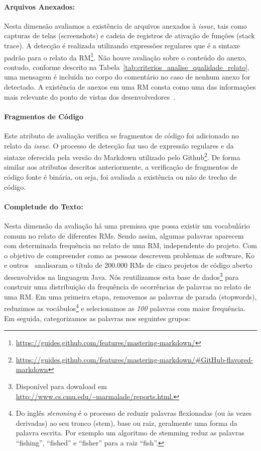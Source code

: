\paragraph{Arquivos Anexados:}
\label{par:arquivos_anexados}

Nesta dimensão avaliamos a existência de arquivos anexados à \textit{issue},
tais como capturas de telas (screenshots) e cadeia de registros de ativação de
funções (stack trace). A detecção é realizada utilizando expressões regulares
que é a sintaxe padrão para o relato da
RM\footnote{\url{https://guides.github.com/features/mastering-markdown/}}. Não
houve avaliação sobre o conteúdo do anexo, contudo, conforme descrito na
Tabela~\ref{tab:criterios_analise_qualidade_relato}, uma mensagem é incluída no
corpo do comentário no caso de nenhum anexo for detectado. A existência de
anexos em uma RM consta como uma das informações mais relevante do ponto de
vistas dos desenvolvedores~\cite{bettenburg2008makes}.

\paragraph{Fragmentos de Código}
\label{par:fragmentos_de_código}

Este atributo de avaliação verifica se fragmentos de código foi adicionado no
relato da \textit{issue}. O processo de detecção faz uso de expressão regulares
e da sintaxe oferecida pela versão do Markdown utilizado pelo
Github\footnote{\url{https://guides.github.com/features/mastering-markdown/\#GitHub-flavored-markdown}}.
De forma similar aos atributos descritos anteriormente, a verificação de
fragmentos de código fonte é binária, ou seja, foi avaliada a existência ou não
de trecho de código.

\paragraph{Completude do Texto:}
\label{par:completude_de_palavras_chaves}

Nesta dimensão da avaliação há uma premissa que possa existir um vocabulário
comum no relato de diferentes RMs. Sendo assim, algumas palavras aparecem com
determinada frequência no relato de uma RM, independente do projeto. Com o
objetivo de compreender como as pessoas descrevem problemas de software, Ko e
outros~\cite{ko2006linguistic} analisaram o título de 200.000 RMs de cinco
projetos de código aberto desenvolvidos na linguagem Java. Nós reutilizamos esta
base de dados\footnote{Disponível para download em
    \url{http://www.cs.cmu.edu/~marmalade/reports.html.}} para construir uma
distribuição da frequência de ocorrências de palavras no relato de uma RM\@.  Em
uma primeira etapa, removemos as palavras de parada (stopwords), reduzimos as
vocábulos\footnote{Do inglês \textit{stemming} é o processo de reduzir palavras
    flexionadas (ou às vezes derivadas) ao seu tronco (stem), base ou raiz,
    geralmente uma forma da palavra escrita. Por exemplo um algoritmo de
    stemming reduz as palavras ``fishing'', ``fished'' e ``fisher'' para a raiz
    ``fish''.} e selecionamos as \textit{100} palavras com maior frequência. Em
seguida, categorizamos as palavras nos seguintes grupos:

